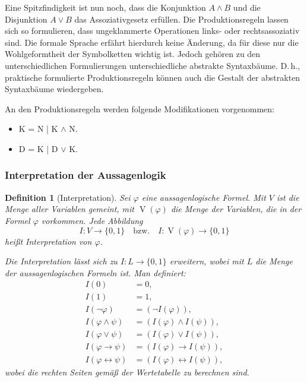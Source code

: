 \documentclass[a4paper,11pt,fleqn,twoside]{scrartcl}
\numberwithin{equation}{section}
\theoremstyle{rmbox}
\newtheorem{Definition}{Definition}
\newcommand{\emdef}[1]{\emph{#1}}
\newcommand{\bitem}{\item[\scriptsize\color{gray1}$\blacksquare$]}
\begin{document}
Eine Spitzfindigkeit ist nun noch, dass die Konjunktion $A\land B$
und die Disjunktion $A\lor B$ das Assoziativgesetz erfüllen.
Die Produktionsregeln lassen sich so formulieren, dass ungeklammerte
Operationen links- oder rechtsassoziativ sind. Die formale Sprache
erfährt hierdurch keine Änderung, da für diese nur die
Wohlgeformtheit der Symbolketten wichtig ist. Jedoch gehören zu
den unterschiedlichen Formulierungen unterschiedliche abstrakte
Syntaxbäume. D.\,h., praktische formulierte Produktionsregeln können
auch die Gestalt der abstrakten Syntaxbäume wiedergeben.

An den Produktionsregeln werden folgende Modifikationen vorgenommen:
\begin{itemize}[noitemsep,topsep=4pt]
\setlength\itemsep{4pt}
\bitem K = N | K $\land$ N.
\bitem D = K | D $\lor$ K.
\end{itemize}

\subsubsection{Interpretation der Aussagenlogik}
\begin{Definition}[Interpretation]
Sei $\varphi$ eine aussagenlogische Formel. Mit $V$ ist die
Menge aller Variablen gemeint, mit $\operatorname{V}(\varphi)$ die
Menge der Variablen, die in der Formel $\varphi$ vorkommen.
Jede Abbildung%
\begin{equation}
I\colon V\to\{0,1\}\quad\text{bzw.}\quad
I\colon\operatorname{V}(\varphi)\to\{0,1\}
\end{equation}
heißt \emdef{Interpretation} von $\varphi$.

Die Interpretation lässt sich zu $I\colon L\to\{0,1\}$
erweitern, wobei mit $L$ die Menge der aussagenlogischen Formeln
ist. Man definiert:
\begin{align}
I(0) &= 0,\\
I(1) &= 1,\\
I(\neg\varphi) &= (\neg I(\varphi)),\\
I(\varphi\land\psi) &= (I(\varphi)\land I(\psi)),\\
I(\varphi\lor\psi) &= (I(\varphi)\lor I(\psi)),\\
I(\varphi\rightarrow\psi) &= (I(\varphi)\rightarrow I(\psi)),\\
I(\varphi\leftrightarrow\psi) &= (I(\varphi)\leftrightarrow I(\psi)),
\end{align}
wobei die rechten Seiten gemäß der Wertetabelle zu berechnen sind.
\end{Definition}
\end{document}
